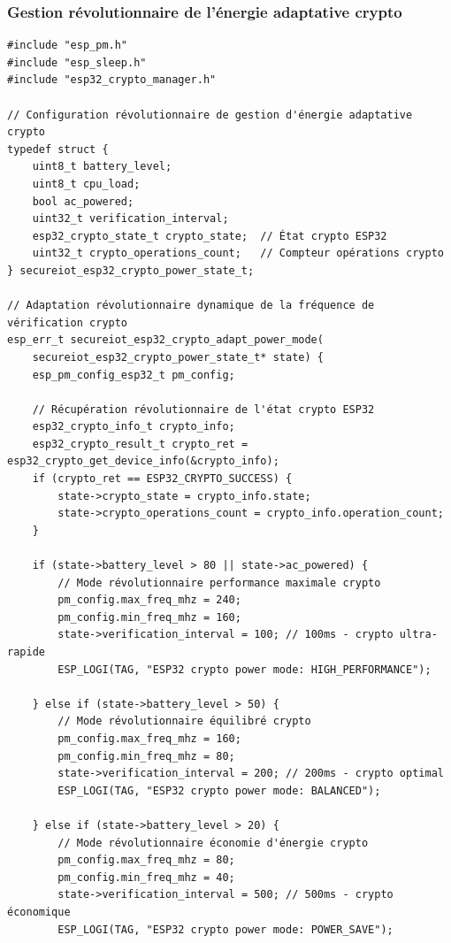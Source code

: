 \subsubsection{Gestion révolutionnaire de l'énergie adaptative crypto}

\begin{lstlisting}[caption={Gestion révolutionnaire énergétique intelligente ESP32 crypto}]
#include "esp_pm.h"
#include "esp_sleep.h"
#include "esp32_crypto_manager.h"

// Configuration révolutionnaire de gestion d'énergie adaptative crypto
typedef struct {
    uint8_t battery_level;
    uint8_t cpu_load;
    bool ac_powered;
    uint32_t verification_interval;
    esp32_crypto_state_t crypto_state;  // État crypto ESP32
    uint32_t crypto_operations_count;   // Compteur opérations crypto
} secureiot_esp32_crypto_power_state_t;

// Adaptation révolutionnaire dynamique de la fréquence de vérification crypto
esp_err_t secureiot_esp32_crypto_adapt_power_mode(
    secureiot_esp32_crypto_power_state_t* state) {
    esp_pm_config_esp32_t pm_config;
    
    // Récupération révolutionnaire de l'état crypto ESP32
    esp32_crypto_info_t crypto_info;
    esp32_crypto_result_t crypto_ret = esp32_crypto_get_device_info(&crypto_info);
    if (crypto_ret == ESP32_CRYPTO_SUCCESS) {
        state->crypto_state = crypto_info.state;
        state->crypto_operations_count = crypto_info.operation_count;
    }
    
    if (state->battery_level > 80 || state->ac_powered) {
        // Mode révolutionnaire performance maximale crypto
        pm_config.max_freq_mhz = 240;
        pm_config.min_freq_mhz = 160;
        state->verification_interval = 100; // 100ms - crypto ultra-rapide
        ESP_LOGI(TAG, "ESP32 crypto power mode: HIGH_PERFORMANCE");
        
    } else if (state->battery_level > 50) {
        // Mode révolutionnaire équilibré crypto
        pm_config.max_freq_mhz = 160;
        pm_config.min_freq_mhz = 80;
        state->verification_interval = 200; // 200ms - crypto optimal
        ESP_LOGI(TAG, "ESP32 crypto power mode: BALANCED");
        
    } else if (state->battery_level > 20) {
        // Mode révolutionnaire économie d'énergie crypto
        pm_config.max_freq_mhz = 80;
        pm_config.min_freq_mhz = 40;
        state->verification_interval = 500; // 500ms - crypto économique
        ESP_LOGI(TAG, "ESP32 crypto power mode: POWER_SAVE");
        

\end{lstlisting}
